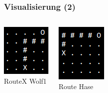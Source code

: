 \documentclass{beamer}
\begin{document}
\begin{frame}
\frametitle{Visualisierung (2)}
\begin{columns}[c] %

\includegraphics[scale=1,natwidth=610,natheight=642]{wolf_route.png}\\
RouteX Wolf1

\includegraphics[scale=1,natwidth=610,natheight=642]{hare_route.png}\\
Route Hase
\end{columns}
\end{frame}
\end{document}

